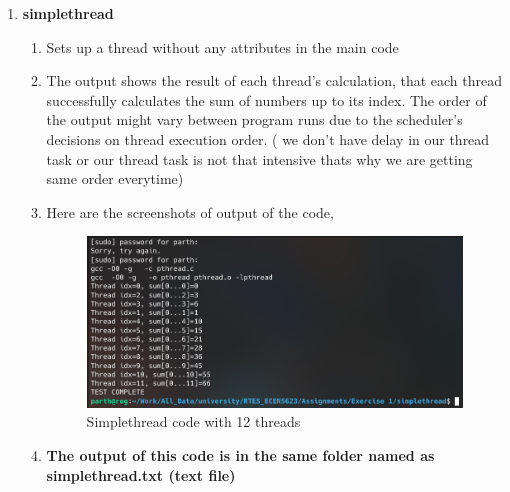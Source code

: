 \documentclass[a4paper,11pt]{article}%
\newenvironment{qanda}{\setlength{\parindent}{0pt}}{\bigskip}
\begin{document}
\begin{qanda}
\begin{enumerate}
\begin{enumerate}
\begin{enumerate}
\begin{enumerate}
					\end{enumerate}
					\item \textbf{simplethread}
					\begin{enumerate}
						\item Sets up a thread without any attributes in the main code
						\item The output shows the result of each thread's calculation, that each thread successfully calculates the sum of numbers up to its index. The order of the output might vary between program runs due to the scheduler's decisions on thread execution order. ( we don't have delay in our thread task or our thread task is not that intensive thats why we are getting same order everytime)

						\item Here are the screenshots of output of the code, 
						\begin{figure}[H]
							\centering
							\includegraphics[scale=0.5]{figures/simplethread.png}
							\caption{Simplethread code with 12 threads}
							\label{rm}
						\end{figure}
						

						\item \textbf{The output of this code is in the same folder named as simplethread.txt (text file) }
						

\end{enumerate}
\end{enumerate}
\end{enumerate}
\end{enumerate}
\end{qanda}
\end{document}
